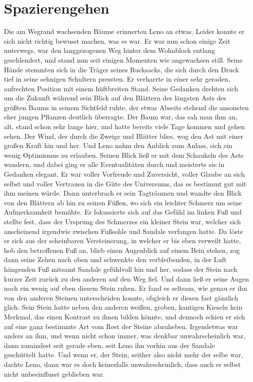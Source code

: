 \documentclass[ngerman,smalldemyvopaper,11pt,oneside,onecolumn,openright,extrafontsizes]{memoir}
\begin{document}
\chapter{Spazierengehen}
Die am Wegrand wachsenden Bäume erinnerten Leno an etwas. Leider konnte er sich nicht richtig bewusst machen, was es war. Er war nun schon einige Zeit unterwegs, war den langgezogenen Weg hinter dem Wohnblock entlang geschlendert, und stand nun seit einigen Momenten wie angewachsen still. Seine Hände stemmten sich in die Träger seines Rucksacks, die sich durch den Druck tief in seine sehnigen Schultern pressten. Er verharrte in einer sehr geraden, aufrechten Position mit einem hüftbreiten Stand. Seine Gedanken drehten sich um die Zukunft während sein Blick auf den Blättern des längsten Asts des größten Baums in seinem Sichtfeld ruhte, der etwas Abseits stehend die ansonsten eher jungen Pflanzen deutlich überragte. Der Baum war, das sah man ihm an, alt, stand schon sehr lange hier, und hatte bereits viele Tage kommen und gehen sehen. Der Wind, der durch die Zweige und Blätter blies, wog den Ast mit einer großen Kraft hin und her. Und Leno nahm den Anblick zum Anlass, sich ein wenig Optimismus zu erlauben. Seinen Blick ließ er mit dem Schaukeln des Asts wandern, und dabei ging er alle Eventualitäten durch und meisterte sie in Gedanken elegant. Er war voller Vorfreude und Zuversicht, voller Glaube an sich selbst und voller Vertrauen in die Güte des Universums, das es bestimmt gut mit ihm meinen würde.
Dann unterbrach er sein Tagträumen und wandte den Blick von den Blättern ab hin zu seinen Füßen, wo sich ein leichter Schmerz um seine Aufmerksamkeit bemühte. Er fokussierte sich auf das Gefühl im linken Fuß und stellte fest, dass der Ursprung des Schmerzes ein kleiner Stein war, welcher sich anscheinend irgendwie zwischen Fußsohle und Sandale verfangen hatte. Da löste er sich aus der scheinbaren Versteinerung, in welcher er bis eben verweilt hatte, hob den betroffenen Fuß an, blieb einen Augenblick auf einem Bein stehen, zog dann seine Zehen nach oben und schwenkte den verbleibenden, in der Luft hängenden Fuß mitsamt Sandale gefühlvoll hin und her, sodass der Stein nach kurzer Zeit zurück zu den anderen auf den Weg fiel. Und dann ließ er seine Augen noch ein wenig auf eben diesem Stein ruhen. Er fand es seltsam, wie genau er ihn von den anderen Steinen unterscheiden konnte, obgleich er diesen fast gänzlich glich. Sein Stein hatte neben den anderen weißen, groben, kantigen Kieseln kein Merkmal, das einen Kontrast zu ihnen bilden könnte, und dennoch schien er sich auf eine ganz bestimmte Art vom Rest der Steine abzuheben. Irgendetwas war anders an ihm, und wenn nicht schon immer, was denkbar unwahrscheinlich war, dann zumindest seit gerade eben, seit Leno ihn vorhin aus der Sandale geschüttelt hatte. Und wenn er, der Stein, seither also nicht mehr der selbe war, dachte Leno, dann war es doch keinesfalls unwahrscheinlich, dass auch er selbst nicht unbeeinflusst geblieben war.
\end{document}
